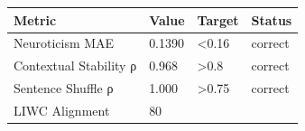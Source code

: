 \begin{tabular}{llll}
\toprule
Metric & Value & Target & Status \\
\midrule
Neuroticism MAE & 0.1390 & <0.16 & correct \\
Contextual Stability ρ & 0.968 & >0.8 & correct \\
Sentence Shuffle ρ & 1.000 & >0.75 & correct \\
LIWC Alignment & 80%
\bottomrule
\end{tabular}
